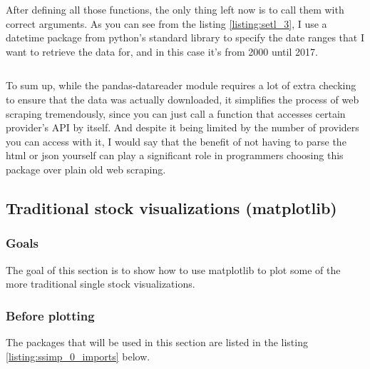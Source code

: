 \documentclass[12pt, a4paper]{article}
\begin{document}

After defining all those functions, the only thing left now is to call them with correct arguments. As you can see from the listing \ref{listing:setl_3}, I use a datetime package from python’s standard library to specify the date ranges that I want to retrieve the data for, and in this case it’s from 2000 until 2017.

\bgroup
  \inputminted[linenos, breaklines=true, fontsize=\scriptsize, firstnumber=last]{python}{src/stocks/etl/3_executing.py}
  \label{listing:setl_3}
\egroup

To sum up, while the pandas-datareader module requires a lot of extra checking to ensure that the data was actually downloaded, it simplifies the process of web scraping tremendously, since you can just call a function that accesses certain provider’s API by itself. And despite it being limited by the number of providers you can access with it, I would say that the benefit of not having to parse the html or json yourself can play a significant role in programmers choosing this package over plain old web scraping.



\newpage
\subsection{Traditional stock visualizations (matplotlib)}
\subsubsection{Goals}
The goal of this section is to show how to use matplotlib to plot some of the more traditional single stock visualizations.

\subsubsection{Before plotting}


The packages that will be used in this section are listed in the listing \ref{listing:ssimp_0_imports} below.

\bgroup
  \inputminted[linenos, breaklines=true, fontsize=\scriptsize]{python}{src/stocks/simple/0_imports.py}
  \label{listing:ssimp_0_imports}
\egroup
\end{document}
